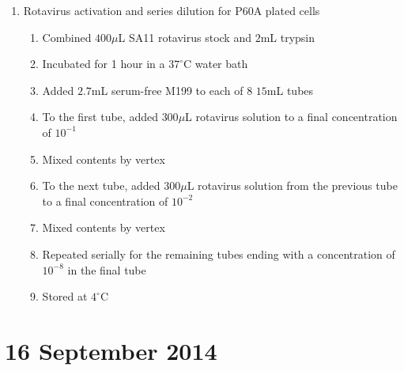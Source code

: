 \begin{enumerate}
	\item Rotavirus activation and series dilution for P60A plated cells
		\begin{enumerate}
			\item Combined $400\mu$L SA11 rotavirus stock and $2$mL trypsin
			\item Incubated for 1 hour in a $37^{\circ}$C water bath
			\item Added $2.7$mL serum-free M199 to each of 8 $15$mL tubes
			\item To the first tube, added $300\mu$L rotavirus solution to a final concentration of $10^{-1}$
			\item Mixed contents by vertex
			\item To the next tube, added $300\mu$L rotavirus solution from the previous tube to a final concentration of $10^{-2}$
			\item Mixed contents by vertex
			\item Repeated serially for the remaining tubes ending with a concentration of $10^{-8}$ in the final tube
			\item Stored at $4^{\circ}$C
		\end{enumerate}
\end{enumerate}

\section*{16 September 2014}

